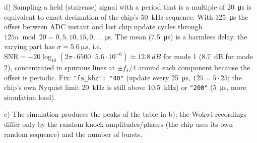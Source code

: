 \begin{solution}
d) Sampling a held (staircase) signal with a period that is a multiple of
\SI{20}{\micro s} is equivalent to exact decimation of the chip's
\SI{50}{kHz} sequence. With \SI{125}{\micro s} the offset between ADC instant
and last chip update cycles through $125n \bmod 20 = 0, 5, 10, 15, 0,\dots$
\si{\micro s}. The mean (\SI{7.5}{\micro s}) is a harmless delay, the varying
part has $\sigma=\SI{5.6}{\micro s}$, i.e.\
$\mathrm{SNR}=-20\log_{10}(2\pi\cdot6500\cdot5.6\cdot10^{-6})\approx\SI{12.8}{dB}$
for mode 1 (\SI{8.7}{dB} for mode 2), concentrated in spurious lines at
$\pm f_s/4$ around each component because the offset is periodic. Fix:
\texttt{"fs\_khz": "40"} (update every \SI{25}{\micro s}, $125=5\cdot25$; the
chip's own Nyquist limit \SI{20}{kHz} is still above \SI{10.5}{kHz}) or
\texttt{"200"} (\SI{5}{\micro s}, more simulation load).

e) The simulation produces the peaks of the table in b); the Wokwi
recordings differ only by the random knock amplitudes/phases (the chip uses
its own random sequence) and the number of bursts.
\end{solution}

